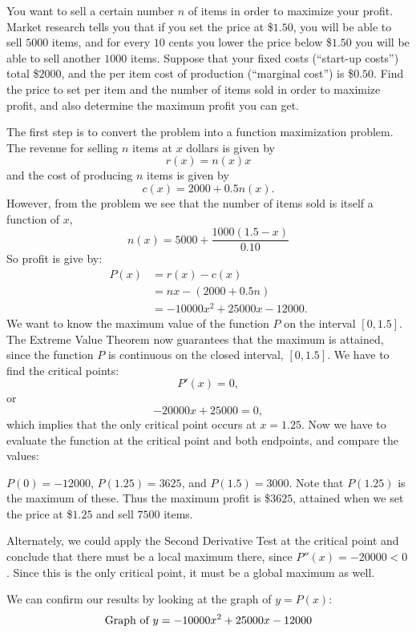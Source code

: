 \documentclass{ximera}
\begin{document}
\begin{example}
  You want to sell a certain number $n$ of items in order to maximize
  your profit.  Market research tells you that if you set the price at
  \$$1.50$, you will be able to sell $5000$ items, and for every $10$
  cents you lower the price below \$$1.50$ you will be able to sell
  another $1000$ items.  Suppose that your fixed costs (``start-up
  costs'') total \$$2000$, and the per item cost of production
  (``marginal cost'') is \$$0.50$.  Find the price to set per item and
  the number of items sold in order to maximize profit, and also
  determine the maximum profit you can get.
\begin{explanation}
The first step is to convert the problem into a function maximization
problem. The revenue for selling $n$ items at $x$ dollars is given by
\[
r(x) = n(x)x
\]
and the cost of producing $n$ items is given by
\[
c(x) = 2000+0.5 n(x). 
\]
However, from the problem we see that the number of items sold is
itself a function of $x$,
\[
n(x) =5000+\frac{1000(1.5-x)}{0.10}
\]
So profit is give by:
\begin{align*}
P(x) &= r(x) - c(x)\\
&= nx - (2000+0.5 n)\\
&=-10000x^2+25000x-12000. 
\end{align*}
We want to know the maximum value of the function $P$ on the interval $[0,1.5]$.
The Extreme Value Theorem now guarantees that the maximum is attained, since the function $P$ is continuous on the closed interval, $[0,1.5]$. 
We have to find the critical points:
\[
P'(x)=0,
\]
or
\[
-20000x+25000=0,
\]
which implies that the only critical point occurs at $x=1.25$.
Now we have to evaluate the function at the critical point and both endpoints, and compare the values:

$P(0)=-12000$, $P(1.25)=3625$, and $P(1.5)=3000$.
 Note that
$P(1.25)$ is the maximum of these. Thus the maximum profit is
\$$3625$, attained when we set the price at \$$1.25$ and sell $7500$ items.

Alternately, we could apply the Second Derivative Test at the critical point and conclude that
there must be a
local maximum there, since $P''(x)=-20000<0$. Since this is the only critical point,
it must be a global maximum as well. 
\begin{onlineOnly} 
   We can confirm our results by looking at the graph of $y=P(x)$:
   \[
   \graph[xmin=0,xmax=3,ymin=-4000,ymax=6000]{y=-10000x^2+25000x-12000}
   \]
\end{onlineOnly}
\end{explanation}
\end{example}
\end{document}
